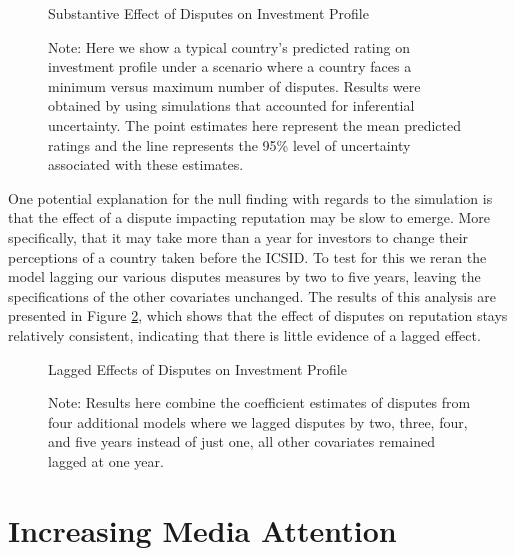 \documentclass[12pt,onesided]{amsart}
\begin{document}

\begin{figure}[ht]
	\vspace{4cm}
	\centering
	\caption{Substantive Effect of Disputes on Investment Profile}
	\label{fig:subEffect}
	\resizebox{1\textwidth}{!}{}
	\caption*{Note: Here we show a typical country's predicted rating on investment profile under a scenario where a country faces a minimum versus maximum number of disputes. Results were obtained by using simulations that accounted for inferential uncertainty. The point estimates here represent the mean predicted ratings and the line represents the 95\% level of uncertainty associated with these estimates.}
\end{figure}


One potential explanation for the null finding with regards to the simulation is that the effect of a dispute impacting reputation may be slow to emerge. More specifically, that it may take more than a year for investors to change their perceptions of a country taken before the ICSID. To test for this we reran the model lagging our various disputes measures by two to five years, leaving the specifications of the other covariates unchanged. The results of this analysis are presented in Figure \ref{fig:lagEffect}, which shows that the effect of disputes on reputation stays relatively consistent, indicating that there is little evidence of a lagged effect.


\begin{figure}[ht]
	\vspace{3cm}
	\centering
	\caption{Lagged Effects of Disputes on Investment Profile}
	\label{fig:lagEffect}
	\resizebox{1\textwidth}{!}{}	
	\caption*{Note: Results here combine the coefficient estimates of disputes from four additional models where we lagged disputes by two, three, four, and five years instead of just one, all other covariates remained lagged at one year.}
\end{figure}


\section*{Increasing Media Attention}
\end{document}
